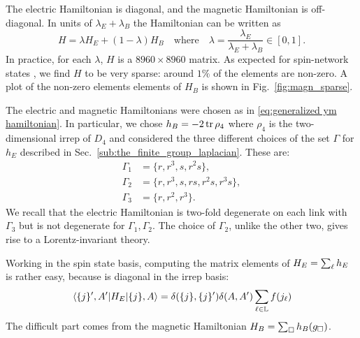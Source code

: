The electric Hamiltonian is diagonal, and the magnetic Hamiltonian is off-diagonal.
In units of $\lambda_E + \lambda_B$ the Hamiltonian can be written as
\begin{equation}
    H = \lambda H_E + (1-\lambda) H_B
    \quad \text{where} \quad
    \lambda = \frac{\lambda_E}{\lambda_E + \lambda_B} \in [0, 1].
\end{equation}
In practice, for each $\lambda$, $H$ is a $8960 \times 8960$ matrix.
As expected for spin-network states \cite{burgio2000physical}, we find $H$ to be very sparse: around $1\%$ of the elements are non-zero.
A plot of the non-zero elements elements of $H_B$ is shown in Fig.~\ref{fig:magn_sparse}.

The electric and magnetic Hamiltonians were chosen as in \eqref{eq:generalized ym hamiltonian}.
In particular, we chose $h_B = -2 \tr \rho_4$ where $\rho_4$ is the two-dimensional irrep of $D_4$ and considered the three different choices of the set $\Gamma$ for $h_E$ described in Sec.~\ref{sub:the_finite_group_laplacian}.
These are:
\begin{equation*}
    \begin{split}
        \Gamma_1 & = \{r,r^3,s,r^2s\}, \\
        \Gamma_2 & = \{r, r^3, s, rs, r^2s, r^3s\}, \\
        \Gamma_3 & = \{r, r^2, r^3\}.
    \end{split}
\end{equation*}
We recall that the electric Hamiltonian is two-fold degenerate on each link with $\Gamma_3$ but is not degenerate for $\Gamma_1, \Gamma_2$.
The choice of $\Gamma_2$, unlike the other two, gives rise to a Lorentz-invariant theory.

Working in the spin state basis, computing the matrix elements of $H_E = \sum_{\ell} h_E$ is rather easy, because is diagonal in the \ac{irrep} basis:
\begin{equation}
    \mel{ \{j\}^{\prime}, A^{\prime}}{H_E}{ \{j\}, A} =
    \delta( \{j\}, \{j\}^{\prime}) \delta(A, A^{\prime}) \sum_{\ell \in \mathbb{L}} f(j_{\ell})
\end{equation}
The difficult part comes from the magnetic Hamiltonian $H_B = \sum_{\square} h_B(g_{\square})$.

